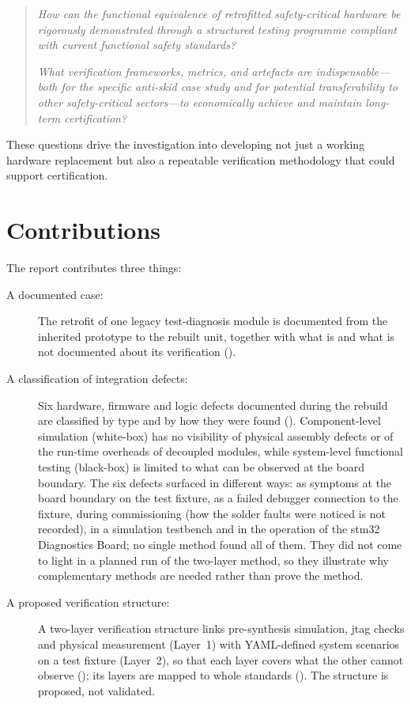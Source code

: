 \begin{quote}
	\textit{How can the functional equivalence of retrofitted safety-critical hardware be rigorously demonstrated through a structured testing programme compliant with current functional safety standards?}

	\textit{What verification frameworks, metrics, and artefacts are indispensable---both for the specific anti-skid case study and for potential transferability to other safety-critical sectors---to economically achieve and maintain long-term certification?}
\end{quote}

These questions drive the investigation into developing not just a working hardware replacement but also a repeatable verification methodology that could support certification.

\section{Contributions}
\label{sec:contributions}

The report contributes three things:
\begin{description}
	\item[A documented case:] The retrofit of one legacy test-diagnosis module is documented from the inherited prototype to the rebuilt unit, together with what is and what is not documented about its verification ().
	\item[A classification of integration defects:] Six hardware, firmware and logic defects documented during the rebuild are classified by type and by how they were found (). Component-level simulation (white-box) has no visibility of physical assembly defects or of the run-time overheads of decoupled modules, while system-level functional testing (black-box) is limited to what can be observed at the board boundary. The six defects surfaced in different ways: as symptoms at the board boundary on the test fixture, as a failed debugger connection to the fixture, during commissioning (how the solder faults were noticed is not recorded), in a simulation testbench and in the operation of the \gls{stm32} Diagnostics Board; no single method found all of them. They did not come to light in a planned run of the two-layer method, so they illustrate why complementary methods are needed rather than prove the method.
	\item[A proposed verification structure:] A two-layer verification structure links pre-syn\-the\-sis simulation, \gls{jtag} checks and physical measurement (Layer~1) with YAML-defined system scenarios on a test fixture (Layer~2), so that each layer covers what the other cannot observe (); its layers are mapped to whole standards (). The structure is proposed, not validated.
\end{description}

